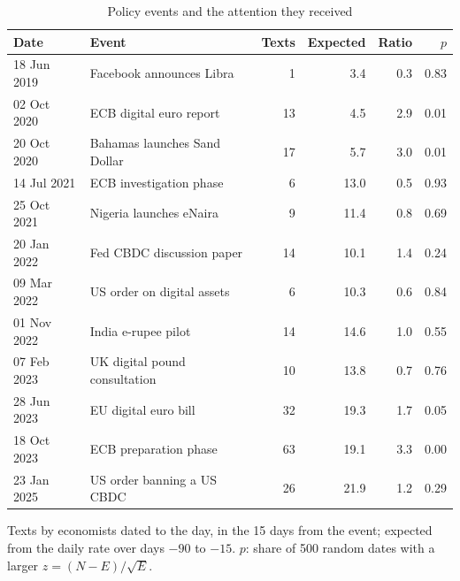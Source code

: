 \begin{table}[htbp]
\centering\small
\caption{Policy events and the attention they received}\label{tab:events}
\begin{tabular}{@{}llrrrr@{}}
\toprule
\textbf{Date} & \textbf{Event} & \textbf{Texts} & \textbf{Expected} & \textbf{Ratio} & $p$ \\
\midrule
18 Jun 2019 & Facebook announces Libra & 1 & 3.4 & 0.3 & 0.83 \\
02 Oct 2020 & ECB digital euro report & 13 & 4.5 & 2.9 & 0.01 \\
20 Oct 2020 & Bahamas launches Sand Dollar & 17 & 5.7 & 3.0 & 0.01 \\
14 Jul 2021 & ECB investigation phase & 6 & 13.0 & 0.5 & 0.93 \\
25 Oct 2021 & Nigeria launches eNaira & 9 & 11.4 & 0.8 & 0.69 \\
20 Jan 2022 & Fed CBDC discussion paper & 14 & 10.1 & 1.4 & 0.24 \\
09 Mar 2022 & US order on digital assets & 6 & 10.3 & 0.6 & 0.84 \\
01 Nov 2022 & India e-rupee pilot & 14 & 14.6 & 1.0 & 0.55 \\
07 Feb 2023 & UK digital pound consultation & 10 & 13.8 & 0.7 & 0.76 \\
28 Jun 2023 & EU digital euro bill & 32 & 19.3 & 1.7 & 0.05 \\
18 Oct 2023 & ECB preparation phase & 63 & 19.1 & 3.3 & 0.00 \\
23 Jan 2025 & US order banning a US CBDC & 26 & 21.9 & 1.2 & 0.29 \\
\bottomrule
\end{tabular}
\par\smallskip\parbox{0.92\linewidth}{\footnotesize Texts by economists dated to the day, in the 15 days from the event; expected from the daily rate over days $-90$ to $-15$. $p$: share of 500 random dates with a larger $z = (N - E)/\sqrt{E}$.}
\end{table}
